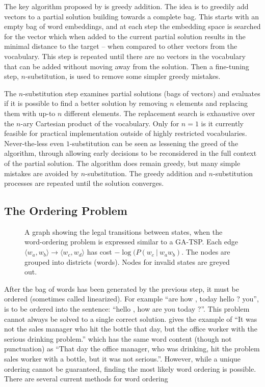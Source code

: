 \documentclass[compsoc]{IEEEtran}
\theoremstyle{plain}
\theoremstyle{definition}
\begin{document}
The key algorithm  proposed by \textcite{White2015BOWgen} is greedy addition. The idea is to greedily add vectors to a partial solution building towards a complete bag. This starts with an empty bag of word embeddings, and at each step the embedding space is searched for the vector which when added to the current partial solution results in the minimal distance to the target -- when compared to other vectors from the vocabulary. This step is repeated until there are no vectors in the vocabulary that can be added without moving away from the solution. Then a fine-tuning step, $n$-substitution, is used to remove some simpler greedy mistakes.

The $n$-substitution step examines partial solutions (bags of vectors) and evaluates if it is possible to find a better solution by removing $n$ elements and replacing them with up-to $n$ different elements. The replacement search is exhaustive over the $n$-ary Cartesian product of the vocabulary. Only for $n=1$ is it currently feasible for practical implementation outside of highly restricted vocabularies. Never-the-less even $1$-substitution can be seen as lessening the greed of the algorithm, through allowing early decisions to be reconsidered in the full context of the partial solution. The algorithm does remain greedy, but many simple mistakes are avoided by $n$-substitution. The greedy addition and $n$-substitution processes are repeated until the solution converges.



\subsection{The Ordering Problem} \label{ordering}
\begin{figure*}
	\begin{center}
	
	\end{center}
	\caption{\label{fig:ordergraph} A graph showing the legal transitions between states, when the word-ordering problem is expressed similar to a GA-TSP. Each edge $\langle w_{a},w_{b}\rangle \to \langle w_{c},w_{d}\rangle$  has cost $-\log(P(w_c\:|\:w_aw_b)$. The nodes are grouped into districts (words). Nodes for invalid states are greyed out.} 
\end{figure*}

After the bag of words has been generated by the previous step, it must be ordered (sometimes called linearized). For example ``are how , today hello ? you'', is to be ordered into the sentence: ``hello , how are you today ?''. This problem cannot always be solved to a single correct solution. \textcite{Mitchell2008}  gives the example of ``It was not the sales manager who hit the bottle that day, but the office worker with the serious drinking problem.'' which has the same word content (though not punctuation) as ``That day the office manager, who was drinking, hit the problem sales worker with a bottle, but it was not serious.''. However, while a unique ordering cannot be guaranteed, finding the most likely word ordering is possible. There are several current methods for word ordering
\end{document}
